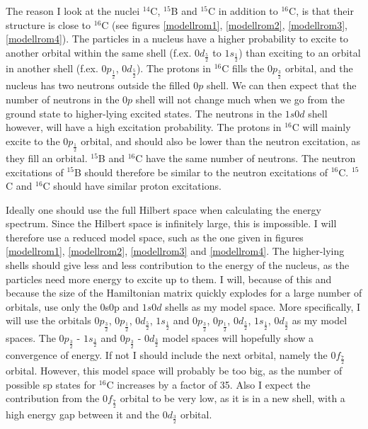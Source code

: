 The reason I look at the nuclei $^{14}$C, $^{15}$B and $^{15}$C in addition to
$^{16}$C, is that their structure is close to $^{16}$C (see figures
\ref{modellrom1}, \ref{modellrom2}, \ref{modellrom3}, \ref{modellrom4}). The
particles in a nucleus have a higher probability to excite to another orbital
within the same shell (f.ex. $0d_{\frac{5}{2}}$ to $1s_{\frac{1}{2}}$) than
exciting to an orbital in another shell (f.ex. $0p_{\frac{1}{2}}$,
$0d_{\frac{5}{2}}$). The protons in $^{16}$C fills the $0p_{\frac{3}{2}}$
orbital, and the nucleus has two neutrons outside the filled $0p$ shell. We can
then expect that the number of neutrons in the $0p$ shell will not change much
when we go from the ground state to higher-lying excited states. The neutrons
in the $1s0d$ shell however, will have a high excitation probability. The
protons in $^{16}$C will mainly excite to the $0p_{\frac{1}{2}}$ orbital, and
should also be lower than the neutron excitation, as they fill an orbital.
$^{15}$B and $^{16}$C have the same number of neutrons. The neutron excitations
of $^{15}$B should therefore be similar to the neutron excitations of $^{16}$C.
$^{15}$C and $^{16}$C should have similar proton excitations. 


Ideally one should use the full Hilbert space when calculating the energy
spectrum. Since the Hilbert space is infinitely large, this is impossible. I
will therefore use a reduced model space, such as the one given in figures
\ref{modellrom1}, \ref{modellrom2}, \ref{modellrom3} and \ref{modellrom4}. The
higher-lying shells should give less and less contribution to the energy of the
nucleus, as the particles need more energy to excite up to them. I will,
because of this and because the size of the Hamiltonian matrix quickly explodes
for a large number of orbitals, use only the 0s0p and $1s0d$ shells as my model
space. More specifically, I will use the orbitals $0p_{\frac{3}{2}}$,
$0p_{\frac{1}{2}}$, $0d_{\frac{5}{2}}$, $1s_{\frac{1}{2}}$ and
$0p_{\frac{3}{2}}$, $0p_{\frac{1}{2}}$, $0d_{\frac{5}{2}}$, $1s_{\frac{1}{2}}$,
$0d_{\frac{3}{2}}$ as my model spaces. The $0p_{\frac{3}{2}}$ - $1s_\frac12$
and $0p_{\frac{3}{2}}$ - $0d_{\frac{3}{2}}$ model spaces will hopefully show a
convergence of energy. If not I should include the next orbital, namely the
$0f_{\frac{7}{2}}$ orbital. However, this model space will probably be too big,
as the number of possible sp states for $^{16}$C increases by a factor of 35.
Also I expect the contribution from the $0f_{\frac{7}{2}}$ orbital to be very
low, as it is in a new shell, with a high energy gap between it and the
$0d_\frac32$ orbital.


